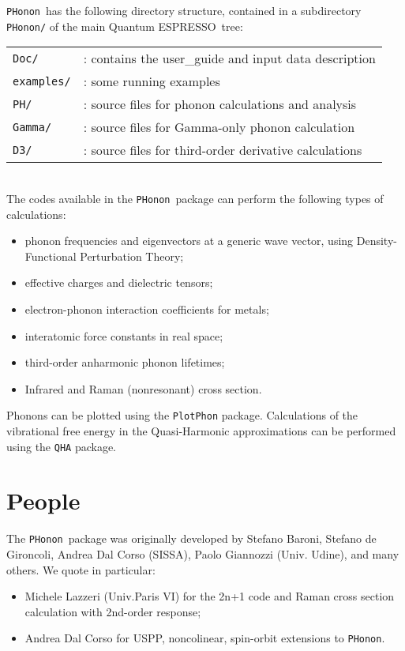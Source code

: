 \documentclass[12pt,a4paper]{article}
\def\qe{{\sc Quantum ESPRESSO}}
\def\PHonon{\texttt{PHonon}}
\begin{document}
\PHonon\ has the following directory structure,
contained in a subdirectory \texttt{PHonon/}
of the main \qe\ tree:

\begin{tabular}{ll}
\texttt{Doc/} & : contains the user\_guide and input data description \\
\texttt{examples/} & : some running examples \\
\texttt{PH/}      & : source files for phonon calculations 
                   and analysis\\
\texttt{Gamma/}  & : source files for Gamma-only phonon calculation\\
\texttt{D3/}     & : source files for third-order derivative
                  calculations \\
\end{tabular}\\
The codes available in the \PHonon\ package can perform the following 
types of calculations:
\begin{itemize}
  \item phonon frequencies and eigenvectors at a generic wave vector,
  using Density-Functional Perturbation Theory;
  \item effective charges and dielectric tensors;
  \item electron-phonon interaction coefficients for metals;
  \item interatomic force constants in real space;
  \item third-order anharmonic phonon lifetimes;
  \item Infrared and Raman (nonresonant) cross section.
\end{itemize}

Phonons can be plotted using the \texttt{PlotPhon} package.
Calculations of the vibrational free energy in the Quasi-Harmonic 
approximations can be performed using the \texttt{QHA}  package.

\section{People}
The \PHonon\ package
was originally developed by Stefano Baroni, Stefano
de Gironcoli, Andrea Dal Corso (SISSA), Paolo Giannozzi (Univ. Udine), 
and many others.
We quote in particular:
\begin{itemize}
  \item Michele Lazzeri (Univ.Paris VI) for the 2n+1 code and Raman 
  cross section calculation with 2nd-order response;
 \item Andrea Dal Corso for USPP, noncolinear, spin-orbit
 extensions to \PHonon.
\end{itemize}
\end{document}
